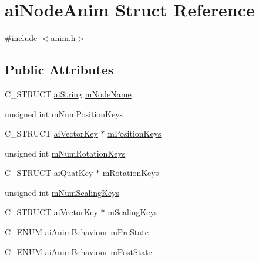\hypertarget{structaiNodeAnim}{\section{ai\-Node\-Anim \-Struct \-Reference}
\label{structaiNodeAnim}
}


{\ttfamily \#include $<$anim.\-h$>$}

\subsection*{\-Public \-Attributes}
\begin{DoxyCompactItemize}
\item 
\-C\-\_\-\-S\-T\-R\-U\-C\-T \hyperlink{structaiString}{ai\-String} \hyperlink{structaiNodeAnim_a22a591381e75214ba03c6aaa770638f3}{m\-Node\-Name}
\item 
unsigned int \hyperlink{structaiNodeAnim_aab725313d31db70adab778a3c125103f}{m\-Num\-Position\-Keys}
\item 
\-C\-\_\-\-S\-T\-R\-U\-C\-T \hyperlink{structaiVectorKey}{ai\-Vector\-Key} $\ast$ \hyperlink{structaiNodeAnim_a983d0db426ac7e5fce442beb19552db3}{m\-Position\-Keys}
\item 
unsigned int \hyperlink{structaiNodeAnim_aca7c78b89c4c64dcdf7619e105e0708c}{m\-Num\-Rotation\-Keys}
\item 
\-C\-\_\-\-S\-T\-R\-U\-C\-T \hyperlink{structaiQuatKey}{ai\-Quat\-Key} $\ast$ \hyperlink{structaiNodeAnim_abe1b0b8b0b30a3950cf09023868a07ac}{m\-Rotation\-Keys}
\item 
unsigned int \hyperlink{structaiNodeAnim_a28fa0fd84571ac79cb45a537192738f6}{m\-Num\-Scaling\-Keys}
\item 
\-C\-\_\-\-S\-T\-R\-U\-C\-T \hyperlink{structaiVectorKey}{ai\-Vector\-Key} $\ast$ \hyperlink{structaiNodeAnim_a4588122722d5148d6e590da820bdf35f}{m\-Scaling\-Keys}
\item 
\-C\-\_\-\-E\-N\-U\-M \hyperlink{anim_8h_a201b9e9429b82cd6423ff4a4daf01cef}{ai\-Anim\-Behaviour} \hyperlink{structaiNodeAnim_a305c01b60886a07b69f04b1db6d7d3c5}{m\-Pre\-State}
\item 
\-C\-\_\-\-E\-N\-U\-M \hyperlink{anim_8h_a201b9e9429b82cd6423ff4a4daf01cef}{ai\-Anim\-Behaviour} \hyperlink{structaiNodeAnim_a93cefd440cbaf587c136eb224d4a0327}{m\-Post\-State}
\end{DoxyCompactItemize}


